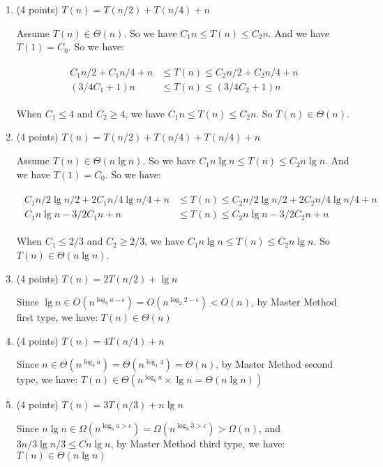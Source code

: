 \documentclass[paper=a4, fontsize=11pt]{scrartcl} %
\numberwithin{equation}{section} %
\numberwithin{figure}{section} %
\numberwithin{table}{section} %
\begin{document}
\begin{enumerate}
\item(4 points) $T(n) = T(n/2) + T(n/4) + n$

  Assume $T(n)\in\Theta(n)$.
  So we have $C_1n \leq T(n)\leq C_2n$.
  And we have $T(1)=C_0$.
  So we have:

  \begin{align}
    \begin{split}
      C_1n/2+C_1n/4+n &\leq T(n) \leq C_2n/2+C_2n/4+n \\
      (3/4C_1+1)n &\leq T(n) \leq (3/4C_2+1)n
    \end{split}
  \end{align}

  When $C_1\leq 4$ and $C_2\geq 4$, we have $C_1n\leq T(n)\leq C_2n$.
  So $T(n)\in\Theta(n)$.

\item(4 points) $T(n) = T(n/2) + T(n/4) + T(n/4) + n$

  Assume $T(n)\in\Theta(n\lg{n})$.
  So we have $C_1n\lg{n}\leq T(n)\leq C_2n\lg{n}$.
  And we have $T(1)=C_0$.
  So we have:

  \begin{align}
    \begin{split}
      C_1n/2\lg{n/2}+2C_1n/4\lg{n/4}+n &\leq T(n) \leq
      C_2n/2\lg{n/2}+2C_2n/4\lg{n/4}+n \\
      C_1n\lg{n}-3/2C_1n+n &\leq T(n) \leq C_2n\lg{n}-3/2C_2n+n
    \end{split}
  \end{align}

  When $C_1\leq 2/3$ and $C_2\geq 2/3$, we have $C_1n\lg{n}\leq T(n)\leq C_2n\lg{n}$.
  So $T(n)\in\Theta(n\lg{n})$.

\item(4 points) $T(n) = 2T(n/2) + \lg{n}$

  Since $\lg{n}\in O(n^{\log_b{a}-\epsilon})=O(n^{\log_2{2}-\epsilon})<O(n)$,
  by Master Method first type, we have: $T(n)\in \Theta(n)$

\item(4 points) $T(n) = 4T(n/4) + n$

  Since $n\in \Theta(n^{\log_b{a}})=\Theta(n^{\log_4{4}})=\Theta(n)$,
  by Master Method second type, we have:
  $T(n)\in \Theta(n^{\log_b{a}}\times \lg{n}=\Theta(n\lg{n}))$

\item(4 points) $T(n) = 3T(n/3) + n\lg{n}$

  Since $n\lg{n}\in \Omega(n^{\log_b{a}>\epsilon})=\Omega(n^{\log_3{3}>\epsilon})>\Omega(n)$,
  and $3n/3\lg{n/3}\leq Cn\lg{n}$,
  by Master Method third type, we have: $T(n)\in \Theta(n\lg{n})$


\end{enumerate}
\end{document}
